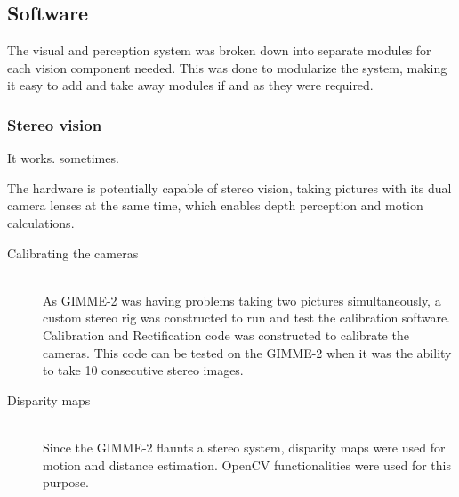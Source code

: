 \subsection{Software}
The visual and perception system was broken down into separate modules for each vision component needed. This was done to modularize the system, making it easy to add and take away modules if and as they were required.  
\subsubsection{Stereo vision}
It works. sometimes.

The hardware is potentially capable of stereo vision, taking pictures with its dual camera lenses at the same time, which enables depth perception and motion calculations.

\begin{description}
  \item [Calibrating the cameras] \hfill \\As GIMME-2 was having problems taking two pictures simultaneously, a custom stereo rig was constructed to run and test the calibration software. Calibration and Rectification code was constructed to calibrate the cameras. This code can be tested on the GIMME-2 when it was the ability to take 10 consecutive stereo images.
  \item [Disparity maps] \hfill \\Since the GIMME-2 flaunts a stereo system, disparity maps were used for motion and distance estimation. OpenCV functionalities were used for this purpose.

\end{description}

